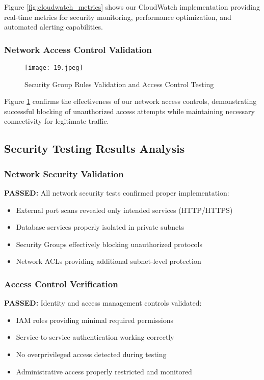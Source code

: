 \documentclass[12pt]{article}
\begin{document}
Figure \ref{fig:cloudwatch_metrics} shows our CloudWatch implementation providing real-time metrics for security monitoring, performance optimization, and automated alerting capabilities.

\subsubsection{Network Access Control Validation}

\begin{figure}[H]
\centering
\texttt{[image: 19.jpeg]}
\caption{Security Group Rules Validation and Access Control Testing}
\label{fig:access_control_validation}
\end{figure}

Figure \ref{fig:access_control_validation} confirms the effectiveness of our network access controls, demonstrating successful blocking of unauthorized access attempts while maintaining necessary connectivity for legitimate traffic.

\subsection{Security Testing Results Analysis}

\subsubsection{Network Security Validation}
\textbf{PASSED:} All network security tests confirmed proper implementation:
\begin{itemize}
\item External port scans revealed only intended services (HTTP/HTTPS)
\item Database services properly isolated in private subnets
\item Security Groups effectively blocking unauthorized protocols
\item Network ACLs providing additional subnet-level protection
\end{itemize}

\subsubsection{Access Control Verification}
\textbf{PASSED:} Identity and access management controls validated:
\begin{itemize}
\item IAM roles providing minimal required permissions
\item Service-to-service authentication working correctly
\item No overprivileged access detected during testing
\item Administrative access properly restricted and monitored
\end{itemize}
\end{document}
